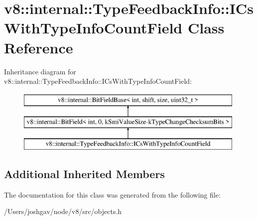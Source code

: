 \hypertarget{classv8_1_1internal_1_1_type_feedback_info_1_1_i_cs_with_type_info_count_field}{}\section{v8\+:\+:internal\+:\+:Type\+Feedback\+Info\+:\+:I\+Cs\+With\+Type\+Info\+Count\+Field Class Reference}
\label{classv8_1_1internal_1_1_type_feedback_info_1_1_i_cs_with_type_info_count_field}
Inheritance diagram for v8\+:\+:internal\+:\+:Type\+Feedback\+Info\+:\+:I\+Cs\+With\+Type\+Info\+Count\+Field\+:\begin{figure}[H]
\begin{center}
\leavevmode
\includegraphics[height=3.000000cm]{classv8_1_1internal_1_1_type_feedback_info_1_1_i_cs_with_type_info_count_field}
\end{center}
\end{figure}
\subsection*{Additional Inherited Members}


The documentation for this class was generated from the following file\+:\begin{DoxyCompactItemize}
\item 
/\+Users/joshgav/node/v8/src/objects.\+h\end{DoxyCompactItemize}
